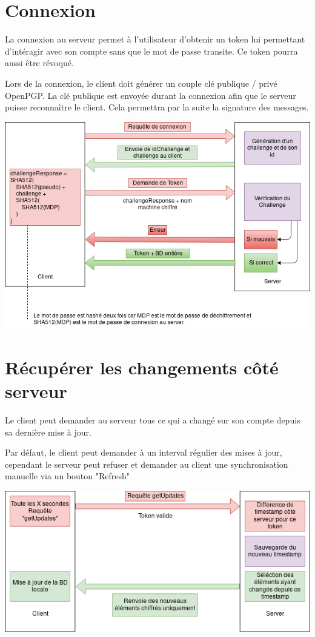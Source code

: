 \documentclass[oneside]{report}
\begin{document}
	\section{Connexion}{
		\par La connexion au serveur permet à l'utilisateur d'obtenir un token lui permettant d'intéragir avec son compte sans que le mot de passe transite. Ce token pourra aussi être révoqué.\\
		\par Lors de la connexion, le client doit générer un couple clé publique / privé OpenPGP. La clé publique est envoyée durant la connexion afin que le serveur puisse reconnaître le client. Cela permettra par la suite la signature des messages.
		\vspace{.5cm}
		\begin{center}
			\includegraphics[scale=.5]{reseau_connexion}
		\end{center}
	}

	\section{Récupérer les changements côté serveur}{
		\par Le client peut demander au serveur tous ce qui a changé sur son compte depuis sa dernière mise à jour.
		\par Par défaut, le client peut demander à un interval régulier des mises à jour, cependant le serveur peut refuser et demander au client une synchronisation manuelle via un bouton "Refresh"
		\begin{center}
			\includegraphics[scale=.5]{reseau_getupdates}
		\end{center}
	}
\end{document}
